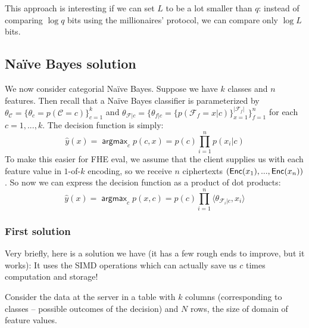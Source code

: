 \documentclass[11pt]{article}
\DeclareMathOperator*{\argmax}{\mathsf{argmax}}
\begin{document}
	This approach is interesting if we can set $L$ to be a lot smaller than $q$: instead of comparing $\log q$ bits using the millionaires' protocol, we can compare only $\log L$ bits.  
	

\subsection{Na\"ive Bayes solution}

%
\newcommand{\NB}{Na\"ive Bayes}

We now consider categorial \NB{}. Suppose we have $k$ classes and $n$ features.
Then recall that a \NB{} classifier is parameterized by $\theta_{\mathcal{C}} =
\{\theta_{c}=p(\mathcal{C}=c)\}_{c=1}^{k}$ and $\theta_{\mathcal{F}|c} =
\{\theta_{f|c}= \{ p(\mathcal{F}_f=x|c) \}_{x=1}^{|\mathcal{F}_f|}
\}_{f=1}^{n}$ for each $c = 1,...,k$. The decision function is simply:
\begin{equation*}
  \hat{y}(x) = \argmax_{c} p(c, x) = p(c)\prod\limits_{i=1}^{n}p(x_i|c)
\end{equation*}
To make this easier for FHE eval, we assume that the client supplies us with each feature value
in $1$-of-$k$ encoding, so we receive $n$ ciphertexts $(\mathsf{Enc}(x_1), ..., \mathsf{Enc}(x_n))$. So now we
can express the decision function as a product of dot products:
\begin{equation*}
  \hat{y}(x) = \argmax_{c} p(x,c) = p(c)\prod\limits_{i=1}^{n} \langle \theta_{\mathcal{F}_i|c}, x_i \rangle
\end{equation*}

      
\subsubsection{First solution} %
\label{ssub:bayes_solution_1}

Very briefly, here is a solution we have (it has a few rough ends to improve, but it works): It uses the SIMD operations which can actually save us $c$ times computation and storage!

Consider the data at the server in a table with $k$ columns (corresponding to classes -- possible outcomes of the decision) and $N$ rows, the size of domain of feature values. 
\end{document}
